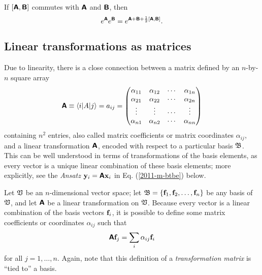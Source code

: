 If $[\textsf{\textbf{A}},\textsf{\textbf{B}}]$ commutes with $\textsf{\textbf{A}}$ and
$\textsf{\textbf{B}}$, then
 \begin{equation}
 e^\textsf{\textbf{A}}e^\textsf{\textbf{B}}=
e^{\textsf{\textbf{A}}+\textsf{\textbf{B}}+{1\over 2}\left[\textsf{\textbf{A}},\textsf{\textbf{B}}\right]}.
 \end{equation}



\subsection{Linear transformations as matrices}


Due to linearity, there is a close connection between a matrix
defined by an $n$-by-$n$ square array
\begin{equation}
\textsf{\textbf{A}} \equiv \langle i\vert A\vert j\rangle = a_{ij}
=
\begin{pmatrix}
\alpha_{11}&
\alpha_{12}&
\cdots    &
\alpha_{1n}\\
\alpha_{21}&
\alpha_{22}&
\cdots    &
\alpha_{2n}\\
\vdots&
\vdots&
\cdots    &
\vdots\\
\alpha_{n1}&
\alpha_{n2}&
\cdots   &
\alpha_{nn}
\end{pmatrix}
\end{equation}
containing $n^2$ entries,
also called matrix coefficients or matrix coordinates $\alpha_{ij}$, and a linear transformation
$\textsf{\textbf{A}}$, encoded with respect to a particular basis ${\frak B}$.
This can be well understood in terms of transformations of the basis elements,
as every vector is a unique linear combination of these basis elements;
more explicitly, see the {\it Ansatz} ${\bf y}_i=  \textsf{\textbf{A}}{\bf x}_i $ in Eq. (\ref{2011-m-btbe}) below.


Let ${\frak V}$ be an $n$-dimensional vector space;
let
${\frak B}=\{{\bf f}_1,{\bf f}_2,\ldots ,{\bf f}_n\}$ be any basis of ${\frak V}$,
and let  $\textsf{\textbf{A}}$ be a linear transformation on ${\frak V}$.
Because every vector is a linear combination of the basis vectors
${\bf f}_i$,
it is possible to define some matrix coefficients or coordinates
$\alpha_{ij}$ such that
\begin{equation}
\textsf{\textbf{A}} {\bf f}_j = \sum_i \alpha_{ij}{\bf f}_i
\end{equation}
for all $j=1,\ldots ,n$.
Again, note that this definition of a {\em transformation matrix}
is ``tied to'' a basis.

